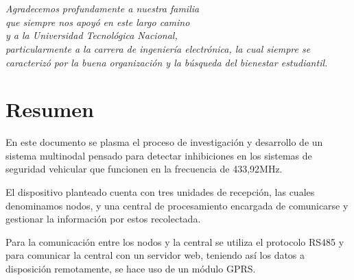 \documentclass[12pt]{report}
\begin{document}

\chapter*{}
\begin{flushright}
\textit{Agradecemos profundamente a nuestra familia \\
que siempre nos apoyó en este largo camino \\
y a la Universidad Tecnológica Nacional, \\
particularmente a la carrera de ingeniería electrónica,
la cual siempre se caracterizó por la buena organización y la búsqueda del bienestar estudiantil.}
\end{flushright}

\chapter*{Resumen} %

En este documento se plasma el proceso de investigación y desarrollo de un sistema multinodal pensado para detectar 
inhibiciones en los sistemas de seguridad vehicular que funcionen en la frecuencia de 433,92MHz.\par
El dispositivo planteado cuenta con tres unidades de recepción, las cuales denominamos nodos, y una central de procesamiento
encargada de comunicarse y gestionar la información por estos recolectada. \par
Para la comunicación entre los nodos y la central se utiliza el protocolo RS485 
y para comunicar la central con un servidor web, teniendo así los datos a disposición remotamente, se hace uso de un módulo GPRS.


\tableofcontents %

\cleardoublepage
\listoffigures %

\cleardoublepage


\pagebreak

\pagebreak


\pagebreak

\pagebreak

\pagebreak

\pagebreak

\pagebreak

\pagebreak
\end{document}
